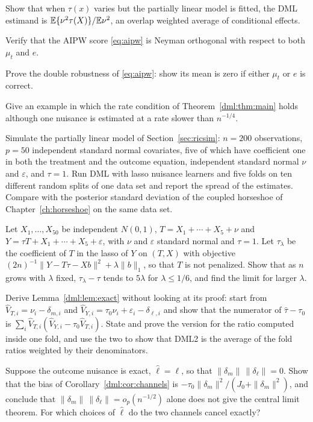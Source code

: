 \begin{exercises}
\item\label{ex:ch04:1} Show that when $\tau(x)$ varies but the partially linear model is fitted, the DML estimand is $\mathbb{E}\{\nu^2 \tau(X)\}/\mathbb{E}\nu^2$, an overlap weighted average of conditional effects.
\item\label{ex:ch04:2} Verify that the AIPW score \eqref{eq:aipw} is Neyman orthogonal with respect to both $\mu_t$ and $e$.
\item\label{ex:ch04:3} Prove the double robustness of \eqref{eq:aipw}: show its mean is zero if either $\mu_t$ or $e$ is correct.
\item\label{ex:ch04:4} Give an example in which the rate condition of Theorem~\ref{dml:thm:main} holds although one nuisance is estimated at a rate slower than $n^{-1/4}$.
\item\label{ex:ch04:5} Simulate the partially linear model of Section~\ref{sec:ricsim}: $n = 200$ observations, $p = 50$ independent standard normal covariates, five of which have coefficient one in both the treatment and the outcome equation, independent standard normal $\nu$ and $\varepsilon$, and $\tau = 1$. Run DML with lasso nuisance learners and five folds on ten different random splits of one data set and report the spread of the estimates. Compare with the posterior standard deviation of the coupled horseshoe of Chapter~\ref{ch:horseshoe} on the same data set.
\item\label{ex:ch04:6} Let $X_1, \ldots, X_{50}$ be independent $N(0,1)$, $T = X_1 + \cdots + X_5 + \nu$ and $Y = \tau T + X_1 + \cdots + X_5 + \varepsilon$, with $\nu$ and $\varepsilon$ standard normal and $\tau = 1$. Let $\tau_\lambda$ be the coefficient of $T$ in the lasso of $Y$ on $(T, X)$ with objective $(2n)^{-1}\|Y - T\tau - Xb\|^2 + \lambda\|b\|_1$, so that $T$ is not penalized. Show that as $n$ grows with $\lambda$ fixed, $\tau_\lambda - \tau$ tends to $5\lambda$ for $\lambda \le 1/6$, and find the limit for larger $\lambda$.
\item\label{ex:ch04:7} Derive Lemma~\ref{dml:lem:exact} without looking at its proof: start from $\hat V_{T,i} = \nu_i - \delta_{m,i}$ and $\hat V_{Y,i} = \tau_0\nu_i + \varepsilon_i - \delta_{\ell,i}$ and show that the numerator of $\hat\tau - \tau_0$ is $\sum_i \hat V_{T,i}(\hat V_{Y,i} - \tau_0\hat V_{T,i})$. State and prove the version for the ratio computed inside one fold, and use the two to show that DML2 is the average of the fold ratios weighted by their denominators.
\item\label{ex:ch04:8} Suppose the outcome nuisance is exact, $\hat\ell = \ell$, so that $\|\delta_m\|\,\|\delta_\ell\| = 0$. Show that the bias of Corollary~\ref{dml:cor:channels} is $-\tau_0\|\delta_m\|^2/(J_0 + \|\delta_m\|^2)$, and conclude that $\|\delta_m\|\,\|\delta_\ell\| = o_p(n^{-1/2})$ alone does not give the central limit theorem. For which choices of $\hat\ell$ do the two channels cancel exactly?

\end{exercises}
